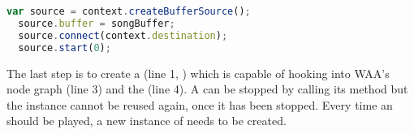 \begin{lstlisting}[language=JavaScript, caption=Playing the \code{AudioBuffer}, label=lst:playbuffer]
  var source = context.createBufferSource();
  source.buffer = songBuffer;
  source.connect(context.destination);
  source.start(0);
\end{lstlisting}

The last step is to create a  (line 1, ) which is capable of hooking into WAA's node graph (line 3) and  the  (line 4). A  can be stopped by calling its  method but the instance cannot be reused again, once it has been stopped. Every time an  should be played, a new instance of  needs to be created.